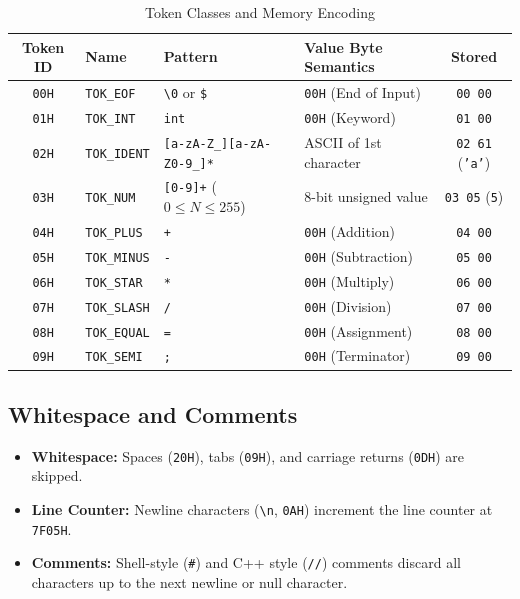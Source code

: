 \documentclass[11pt,a4paper]{article}
\begin{document}
\begin{table}[H]
\centering
\small
\caption{Token Classes and Memory Encoding}
\label{tab:tokens}
\begin{tabularx}{\textwidth}{|c|l|>{\raggedright\arraybackslash}p{4.2cm}|X|c|}
\hline
\rowcolor[gray]{0.92}
\textbf{Token ID} & \textbf{Name} & \textbf{Pattern} & \textbf{Value Byte Semantics} & \textbf{Stored} \\
\hline
\texttt{00H} & \texttt{TOK\_EOF}   & \texttt{\textbackslash 0} or \texttt{\$} & \texttt{00H} (End of Input) & \texttt{00 00} \\
\hline
\texttt{01H} & \texttt{TOK\_INT}   & \texttt{int}             & \texttt{00H} (Keyword)      & \texttt{01 00} \\
\hline
\texttt{02H} & \texttt{TOK\_IDENT} & \texttt{[a-zA-Z\_]}\newline\texttt{[a-zA-Z0-9\_]*} & ASCII of 1st character & \texttt{02 61} (\texttt{'a'}) \\
\hline
\texttt{03H} & \texttt{TOK\_NUM}   & \texttt{[0-9]+} ($0 \le N \le 255$) & 8-bit unsigned value & \texttt{03 05} (\texttt{5}) \\
\hline
\texttt{04H} & \texttt{TOK\_PLUS}  & \texttt{+}               & \texttt{00H} (Addition)    & \texttt{04 00} \\
\hline
\texttt{05H} & \texttt{TOK\_MINUS} & \texttt{-}               & \texttt{00H} (Subtraction) & \texttt{05 00} \\
\hline
\texttt{06H} & \texttt{TOK\_STAR}  & \texttt{*}               & \texttt{00H} (Multiply)    & \texttt{06 00} \\
\hline
\texttt{07H} & \texttt{TOK\_SLASH} & \texttt{/}               & \texttt{00H} (Division)    & \texttt{07 00} \\
\hline
\texttt{08H} & \texttt{TOK\_EQUAL} & \texttt{=}               & \texttt{00H} (Assignment)  & \texttt{08 00} \\
\hline
\texttt{09H} & \texttt{TOK\_SEMI}  & \texttt{;}               & \texttt{00H} (Terminator)  & \texttt{09 00} \\
\hline
\end{tabularx}
\end{table}

\subsection*{Whitespace and Comments}
\begin{itemize}[itemsep=2pt, topsep=2pt]
    \item \textbf{Whitespace:} Spaces (\texttt{20H}), tabs (\texttt{09H}), and carriage returns (\texttt{0DH}) are skipped.
    \item \textbf{Line Counter:} Newline characters (\texttt{\textbackslash n}, \texttt{0AH}) increment the line counter at \texttt{7F05H}.
    \item \textbf{Comments:} Shell-style (\texttt{\#}) and C++ style (\texttt{//}) comments discard all characters up to the next newline or null character.
\end{itemize}
\end{document}
